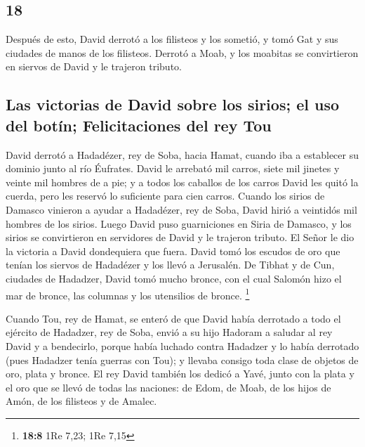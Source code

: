 \begin{paracol}{2}
{\section{18}\label{section-34}}

 Después de esto, David derrotó a los filisteos y los
sometió, y tomó Gat y sus ciudades de manos de los filisteos.
 Derrotó a Moab, y los moabitas se convirtieron en siervos
de David y le trajeron tributo.

\hypertarget{las-victorias-de-david-sobre-los-sirios-el-uso-del-botuxedn-felicitaciones-del-rey-tou}{%
\subsection{Las victorias de David sobre los sirios; el uso del botín;
Felicitaciones del rey
Tou}\label{las-victorias-de-david-sobre-los-sirios-el-uso-del-botuxedn-felicitaciones-del-rey-tou}}

 David derrotó a Hadadézer, rey de Soba, hacia Hamat,
cuando iba a establecer su dominio junto al río Éufrates. 
David le arrebató mil carros, siete mil jinetes y veinte mil hombres de
a pie; y a todos los caballos de los carros David les quitó la cuerda,
pero les reservó lo suficiente para cien carros.  Cuando
los sirios de Damasco vinieron a ayudar a Hadadézer, rey de Soba, David
hirió a veintidós mil hombres de los sirios.  Luego David
puso guarniciones en Siria de Damasco, y los sirios se convirtieron en
servidores de David y le trajeron tributo. El Señor le dio la victoria a
David dondequiera que fuera.  David tomó los escudos de
oro que tenían los siervos de Hadadézer y los llevó a Jerusalén.
 De Tibhat y de Cun, ciudades de Hadadzer, David tomó
mucho bronce, con el cual Salomón hizo el mar de bronce, las columnas y
los utensilios de bronce. \footnote{\textbf{18:8} 1Re 7,23; 1Re 7,15}

 Cuando Tou, rey de Hamat, se enteró de que David había
derrotado a todo el ejército de Hadadzer, rey de Soba, 
envió a su hijo Hadoram a saludar al rey David y a bendecirlo, porque
había luchado contra Hadadzer y lo había derrotado (pues Hadadzer tenía
guerras con Tou); y llevaba consigo toda clase de objetos de oro, plata
y bronce.  El rey David también los dedicó a Yavé, junto
con la plata y el oro que se llevó de todas las naciones: de Edom, de
Moab, de los hijos de Amón, de los filisteos y de Amalec.


\end{paracol}

